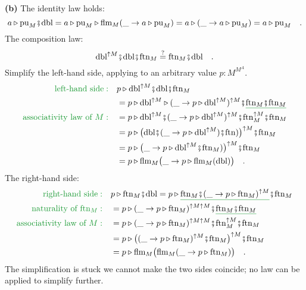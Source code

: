 \textbf{(b)} The identity law holds:
\[
a\triangleright\text{pu}_{M}\bef\text{dbl}=a\triangleright\text{pu}_{M}\triangleright\text{flm}_{M}(\_\rightarrow a\triangleright\text{pu}_{M})=a\triangleright(\_\rightarrow a\triangleright\text{pu}_{M})=a\triangleright\text{pu}_{M}\quad.
\]
The composition law:
\[
\text{dbl}^{\uparrow M}\bef\text{dbl}\bef\text{ftn}_{M}\overset{?}{=}\text{ftn}_{M}\bef\text{dbl}\quad.
\]
Simplify the left-hand side, applying to an arbitrary value $p:M^{M^{A}}$.
\begin{align*}
{\color{greenunder}\text{left-hand side}:}\quad & p\triangleright\text{dbl}^{\uparrow M}\bef\text{dbl}\bef\text{ftn}_{M}\\
 & =p\triangleright\text{dbl}^{\uparrow M}\triangleright(\_\rightarrow p\triangleright\text{dbl}^{\uparrow M})^{\uparrow M}\bef\gunderline{\text{ftn}_{M}\bef\text{ftn}_{M}}\\
{\color{greenunder}\text{associativity law of }M:}\quad & =p\triangleright\text{dbl}^{\uparrow M}\bef(\_\rightarrow p\triangleright\text{dbl}^{\uparrow M})^{\uparrow M}\bef\text{ftn}_{M}^{\uparrow M}\bef\text{ftn}_{M}\\
 & =p\triangleright\big(\text{dbl}\bef(\_\rightarrow p\triangleright\text{dbl}^{\uparrow M})\bef\text{ftn})\big)^{\uparrow M}\bef\text{ftn}_{M}\\
 & =p\triangleright\big(\_\rightarrow p\triangleright\text{dbl}^{\uparrow M}\bef\text{ftn}_{M})\big)^{\uparrow M}\bef\text{ftn}_{M}\\
 & =p\triangleright\text{flm}_{M}\big(\_\rightarrow p\triangleright\text{flm}_{M}(\text{dbl})\big)\quad.
\end{align*}
The right-hand side:
\begin{align*}
{\color{greenunder}\text{right-hand side}:}\quad & p\triangleright\text{ftn}_{M}\bef\text{dbl}=p\triangleright\gunderline{\text{ftn}_{M}\bef(\_\rightarrow p\triangleright\text{ftn}_{M})^{\uparrow M}}\bef\text{ftn}_{M}\\
{\color{greenunder}\text{naturality of }\text{ftn}_{M}:}\quad & =p\triangleright(\_\rightarrow p\triangleright\text{ftn}_{M})^{\uparrow M\uparrow M}\bef\gunderline{\text{ftn}_{M}\bef\text{ftn}_{M}}\\
{\color{greenunder}\text{associativity law of }M:}\quad & =p\triangleright(\_\rightarrow p\triangleright\text{ftn}_{M})^{\uparrow M\uparrow M}\bef\text{ftn}_{M}^{\uparrow M}\bef\text{ftn}_{M}\\
 & =p\triangleright\big((\_\rightarrow p\triangleright\text{ftn}_{M})^{\uparrow M}\bef\text{ftn}_{M}\big)^{\uparrow M}\bef\text{ftn}_{M}\\
 & =p\triangleright\text{flm}_{M}\big(\text{flm}_{M}(\_\rightarrow p\triangleright\text{ftn}_{M})\big)\quad.
\end{align*}
The simplification is stuck \textemdash{} we cannot make the two sides
coincide; no law can be applied to simplify further.

